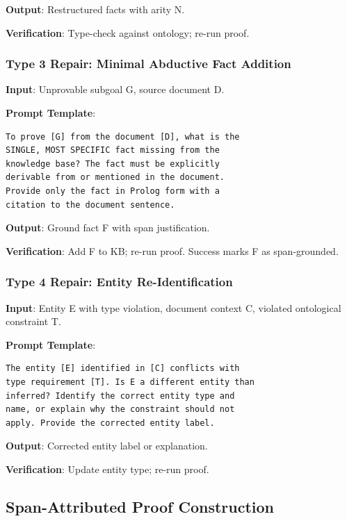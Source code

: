 \documentclass[11pt,letterpaper]{article}
\begin{document}
\textbf{Output}: Restructured facts with arity N.

\textbf{Verification}: Type-check against ontology; re-run proof.

\subsubsection{Type 3 Repair: Minimal Abductive Fact Addition}

\textbf{Input}: Unprovable subgoal G, source document D.

\textbf{Prompt Template}:
\begin{lstlisting}[basicstyle=\small\ttfamily,breaklines=true,frame=single]
To prove [G] from the document [D], what is the
SINGLE, MOST SPECIFIC fact missing from the
knowledge base? The fact must be explicitly
derivable from or mentioned in the document.
Provide only the fact in Prolog form with a
citation to the document sentence.
\end{lstlisting}

\textbf{Output}: Ground fact F with span justification.

\textbf{Verification}: Add F to KB; re-run proof. Success marks F as span-grounded.

\subsubsection{Type 4 Repair: Entity Re-Identification}

\textbf{Input}: Entity E with type violation, document context C, violated ontological constraint T.

\textbf{Prompt Template}:
\begin{lstlisting}[basicstyle=\small\ttfamily,breaklines=true,frame=single]
The entity [E] identified in [C] conflicts with
type requirement [T]. Is E a different entity than
inferred? Identify the correct entity type and
name, or explain why the constraint should not
apply. Provide the corrected entity label.
\end{lstlisting}

\textbf{Output}: Corrected entity label or explanation.

\textbf{Verification}: Update entity type; re-run proof.

\subsection{Span-Attributed Proof Construction}
\end{document}
